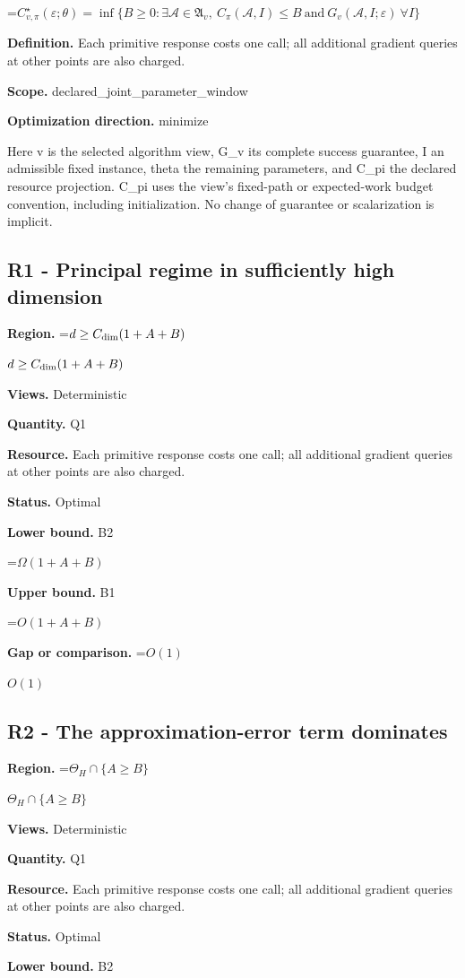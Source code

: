\documentclass[10pt,a4paper]{article}
\newcommand{\AtlasMath}[1]{\par\begingroup\centering\setbox0=\hbox{$\displaystyle #1$}\ifdim\wd0>1.4\linewidth\typeout{ATLAS WIDE FORMULA: \the\wd0}\fi\ifdim\wd0>\linewidth\resizebox{\linewidth}{!}{\box0}\else\box0\fi\par\endgroup}
\newcommand{\AtlasInlineMath}[1]{\begingroup\setbox0=\hbox{$#1$}\ifdim\wd0>.4\linewidth\endgroup\AtlasMath{#1}\else\endgroup$#1$\fi}
\begin{document}
\AtlasMath{C^\star_{v,\pi}(\varepsilon;\theta)=\inf\{B\ge0:\exists\mathcal A\in\mathfrak A_v,\ C_\pi(\mathcal A,I)\le B\ \text{and}\ G_v(\mathcal A,I;\varepsilon)\ \forall I\}}
\textbf{Definition.} Each primitive response costs one call; all additional gradient queries at other points are also charged.

\textbf{Scope.} declared\_joint\_parameter\_window

\textbf{Optimization direction.} minimize

Here v is the selected algorithm view, G\_v its complete success guarantee, I an admissible fixed instance, theta the remaining parameters, and C\_pi the declared resource projection. C\_pi uses the view's fixed-path or expected-work budget convention, including initialization. No change of guarantee or scalarization is implicit.

\subsection{R1 - Principal regime in sufficiently high dimension}
\textbf{Region.} \AtlasInlineMath{d\ge C_{\rm dim}(1+A+B)}

\textbf{Views.} Deterministic

\textbf{Quantity.} Q1

\textbf{Resource.} Each primitive response costs one call; all additional gradient queries at other points are also charged.

\textbf{Status.} Optimal

\textbf{Lower bound.} B2

\AtlasMath{\Omega(1+A+B)}
\textbf{Upper bound.} B1

\AtlasMath{O(1+A+B)}
\textbf{Gap or comparison.} \AtlasInlineMath{O(1)}

\subsection{R2 - The approximation-error term dominates}
\textbf{Region.} \AtlasInlineMath{\Theta_H\cap\{A\ge B\}}

\textbf{Views.} Deterministic

\textbf{Quantity.} Q1

\textbf{Resource.} Each primitive response costs one call; all additional gradient queries at other points are also charged.

\textbf{Status.} Optimal

\textbf{Lower bound.} B2
\end{document}

